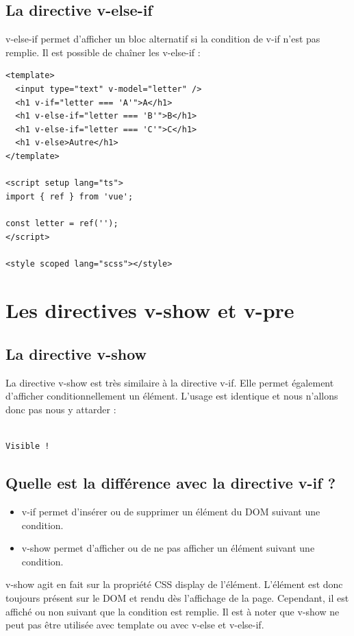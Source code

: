\documentclass{article}
\begin{document}
\subsection{La directive {\color{monOrange}v-else-if}}
{\color{monOrange}v-else-if} permet d'afficher un bloc alternatif si la condition de {\color{monOrange}v-if} n'est pas remplie. Il est possible de chaîner les {\color{monOrange}v-else-if} :
\begin{verbatim}
<template>
  <input type="text" v-model="letter" />
  <h1 v-if="letter === 'A'">A</h1>
  <h1 v-else-if="letter === 'B'">B</h1>
  <h1 v-else-if="letter === 'C'">C</h1>
  <h1 v-else>Autre</h1>
</template>

<script setup lang="ts">
import { ref } from 'vue';

const letter = ref('');
</script>

<style scoped lang="scss"></style>
\end{verbatim}


\section{Les directives v-show et v-pre}
\subsection{La directive {\color{monOrange}v-show}}
La directive {\color{monOrange}v-show} est très similaire à la directive {\color{monOrange}v-if}. Elle permet également d'afficher conditionnellement un élément. L'usage est identique et nous n'allons donc pas nous y attarder :

\begin{verbatim}

Visible !

\end{verbatim}

\subsection{Quelle est la différence avec la directive {\color{monOrange}v-if} ?}
\begin{itemize}
\item {\color{monOrange}v-if} permet d'insérer ou de supprimer un élément du DOM suivant une condition.
\item {\color{monOrange}v-show} permet d'afficher ou de ne pas afficher un élément suivant une condition.
\end{itemize}
 {\color{monOrange}v-show} agit en fait sur la propriété CSS display de l'élément. L'élément est donc toujours présent sur le DOM et rendu dès l'affichage de la page. Cependant, il est affiché ou non suivant que la condition est remplie. Il est à noter que {\color{monOrange}v-show} ne peut pas être utilisée avec {\color{monOrange}template} ou avec {\color{monOrange}v-else} et {\color{monOrange}v-else-if}.
\end{document}
